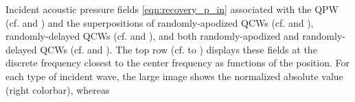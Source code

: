 %
{%
 Incident acoustic pressure fields
 \eqref{eqn:recovery_p_in} associated with
 the \acl{QPW}
 (cf.
  and
 ) and
 the superpositions of
 randomly-apodized \acfp{QCW}
 (cf.
  and
 ),
 randomly-delayed \acp{QCW}
 (cf.
  and
 ), and both
 randomly-apodized and
 randomly-delayed \acp{QCW}
 (cf.
  and
 ).
 The top row
 (cf.
  to
 ) displays
 these fields at
 the discrete frequency closest to
 the center frequency %
 as functions of
 the position.
 For each type of
 incident wave,
 the large image shows
 the normalized absolute value
 (right colorbar), whereas
}

